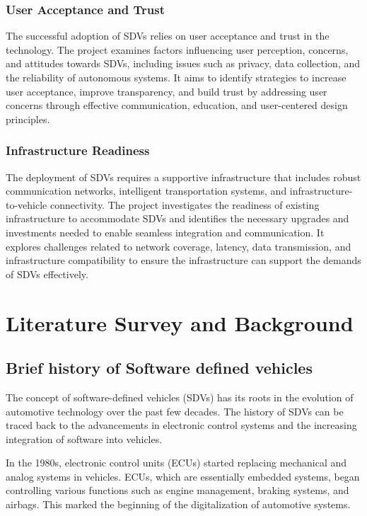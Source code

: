 \documentclass[
12pt,
oneside, 
onehalfspacing, 
nolistspacing, 
parskip, 
chapterinoneline, 
]{AASTCOMPUTER}
\begin{document}
\subsection{User Acceptance and Trust}
The successful adoption of SDVs relies on user acceptance and trust in the technology. The project examines factors influencing user perception, concerns, and attitudes towards SDVs, including issues such as privacy, data collection, and the reliability of autonomous systems. It aims to identify strategies to increase user acceptance, improve transparency, and build trust by addressing user concerns through effective communication, education, and user-centered design principles.

\subsection{Infrastructure Readiness}
The deployment of SDVs requires a supportive infrastructure that includes robust communication networks, intelligent transportation systems, and infrastructure-to-vehicle connectivity. The project investigates the readiness of existing infrastructure to accommodate SDVs and identifies the necessary upgrades and investments needed to enable seamless integration and communication. It explores challenges related to network coverage, latency, data transmission, and infrastructure compatibility to ensure the infrastructure can support the demands of SDVs effectively.

\chapter{Literature Survey and Background}
\section{Brief history of Software defined vehicles}
The concept of software-defined vehicles (SDVs) has its roots in the evolution of automotive technology over the past few decades. The history of SDVs can be traced back to the advancements in electronic control systems and the increasing integration of software into vehicles.

In the 1980s, electronic control units (ECUs) started replacing mechanical and analog systems in vehicles. ECUs, which are essentially embedded systems, began controlling various functions such as engine management, braking systems, and airbags. This marked the beginning of the digitalization of automotive systems.
\end{document}
